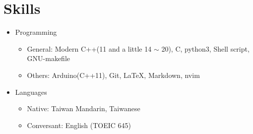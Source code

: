 \section{Skills}
\begin{itemize}
	\item Programming
	\begin{itemize}
		\item General: Modern C++(11 and a little 14 $\sim$ 20), C, python3, Shell script, GNU-makefile
		\item Others: Arduino(C++11), Git, \LaTeX , Markdown, nvim
	\end{itemize}
	\item Languages
	\begin{itemize}
		\item Native: Taiwan Mandarin, Taiwanese
		\item Conversant: English (TOEIC 645)
	\end{itemize}
\end{itemize}